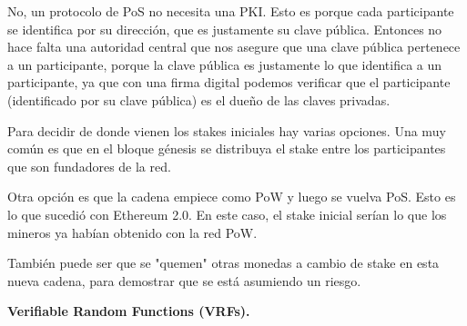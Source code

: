 \documentclass[12pt,addpoints,answers]{exam}
\begin{document}
\begin{questions}
\begin{parts}
    \begin{solution} %
      No, un protocolo de PoS no necesita una PKI. Esto es porque cada participante se identifica por su dirección, que es justamente su clave pública. Entonces no hace falta una autoridad central que nos asegure que una clave pública pertenece a un participante, porque la clave pública es justamente lo que identifica a un participante, ya que con una firma digital podemos verificar que el participante (identificado por su clave pública) es el dueño de las claves privadas.


      Para decidir de donde vienen los stakes iniciales hay varias opciones. Una muy común es que en el bloque génesis se distribuya el stake entre los participantes que son fundadores de la red. 

      Otra opción es que la cadena empiece como PoW y luego se vuelva PoS. Esto es lo que sucedió con Ethereum 2.0. En este caso, el stake inicial serían lo que los mineros ya habían obtenido con la red PoW.

      También puede ser que se "quemen" otras monedas a cambio de stake en esta nueva cadena, para demostrar que se está asumiendo un riesgo.

    \end{solution}

\end{parts}

\newpage

\question  \textbf{Verifiable Random Functions (VRFs).} 
\end{questions}
\end{document}

